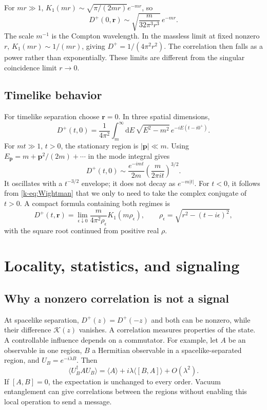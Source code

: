 \documentclass[11pt]{article}
\newcommand{\dd}{\mathrm{d}}
\begin{document}
For \(mr\gg1\), \(K_1(mr)\sim\sqrt{\pi/(2mr)}e^{-mr}\), so
\begin{equation}
 D^+(0,\bm r)\sim\sqrt{\frac{m}{32\pi^3r^3}}\,e^{-mr}.
 \label{k-eq:spacelikeasymptotic}
\end{equation}
The scale \(m^{-1}\) is the Compton wavelength. In the massless limit at
fixed nonzero \(r\), \(K_1(mr)\sim1/(mr)\), giving
\(D^+=1/(4\pi^2r^2)\). The correlation then falls as a power rather than
exponentially. These limits are different from the singular coincidence
limit \(r\to0\).

\subsection{Timelike behavior}
For timelike separation choose \(\bm r=0\). In three spatial dimensions,
\begin{equation}
 D^+(t,0)=\frac{1}{4\pi^2}\int_m^\infty\dd E\,
               \sqrt{E^2-m^2}\,e^{-iE(t-i0^+)}.
 \label{k-eq:timelike}
\end{equation}
For \(mt\gg1\), \(t>0\), the stationary region is \(|\bm p|\ll m\).
Using \(E_{\bm p}=m+\bm p^2/(2m)+\cdots\) in the mode integral gives
\begin{equation}
 D^+(t,0)\sim\frac{e^{-imt}}{2m}
                   \left(\frac{m}{2\pi i t}\right)^{3/2}.
 \label{k-eq:timelikeasymptotic}
\end{equation}
It oscillates with a \(t^{-3/2}\) envelope; it does not decay as
\(e^{-m|t|}\). For \(t<0\), it follows from \eqref{k-eq:Wightman} that we only to need to take the complex conjugate of \(t>0\). A compact formula
containing both regimes is
\begin{equation}
 D^+(t,\bm r)=\lim_{\epsilon\downarrow0}
 \frac{m}{4\pi^2\rho_\epsilon}K_1(m\rho_\epsilon),\qquad
 \rho_\epsilon=\sqrt{r^2-(t-i\epsilon)^2},
 \label{k-eq:analyticW}
\end{equation}
with the square root continued from positive real \(\rho\).

\section{Locality, statistics, and signaling}
\subsection{Why a nonzero correlation is not a signal}
At spacelike separation, \(D^+(z)=D^+(-z)\) and both can be nonzero,
while their difference \(\mathcal K(z)\) vanishes. A correlation measures
properties of the state. A controllable influence depends on a commutator.
For example, let \(A\) be an observable in one region, \(B\) a Hermitian
observable in a spacelike-separated region, and \(U_B=e^{-i\lambda B}\).
Then
\[
 \langle U_B^\dagger A U_B\rangle
 =\langle A\rangle+i\lambda\langle[B,A]\rangle+O(\lambda^2).
\]
If \([A,B]=0\), the expectation is unchanged to every order. Vacuum
entanglement can give correlations between the regions without enabling
this local operation to send a message.
\end{document}
